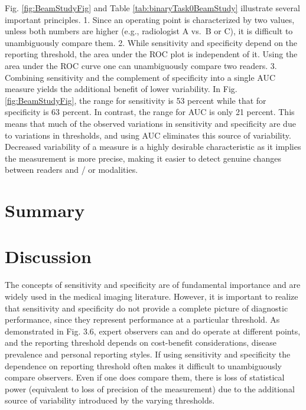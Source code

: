 \documentclass[
]{book}
\begin{document}
Fig. \ref{fig:BeamStudyFig} and Table \ref{tab:binaryTask0BeamStudy} illustrate several important principles.
1. Since an operating point is characterized by two values, unless both numbers are higher (e.g., radiologist A vs.~B or C), it is difficult to unambiguously compare them.
2. While sensitivity and specificity depend on the reporting threshold, the area under the ROC plot is independent of it. Using the area under the ROC curve one can unambiguously compare two readers.
3. Combining sensitivity and the complement of specificity into a single AUC measure yields the additional benefit of lower variability. In Fig. \ref{fig:BeamStudyFig}, the range for sensitivity is 53 percent while that for specificity is 63 percent. In contrast, the range for AUC is only 21 percent. This means that much of the observed variations in sensitivity and specificity are due to variations in thresholds, and using AUC eliminates this source of variability. Decreased variability of a measure is a highly desirable characteristic as it implies the measurement is more precise, making it easier to detect genuine changes between readers and / or modalities.

\hypertarget{binaryTask-Summary}{%
\section{Summary}\label{binaryTask-Summary}}

\hypertarget{binaryTask-Discussion}{%
\section{Discussion}\label{binaryTask-Discussion}}

The concepts of sensitivity and specificity are of fundamental importance and are widely used in the medical imaging literature. However, it is important to realize that sensitivity and specificity do not provide a complete picture of diagnostic performance, since they represent performance at a particular threshold. As demonstrated in Fig. 3.6, expert observers can and do operate at different points, and the reporting threshold depends on cost-benefit considerations, disease prevalence and personal reporting styles. If using sensitivity and specificity the dependence on reporting threshold often makes it difficult to unambiguously compare observers. Even if one does compare them, there is loss of statistical power (equivalent to loss of precision of the measurement) due to the additional source of variability introduced by the varying thresholds.
\end{document}
